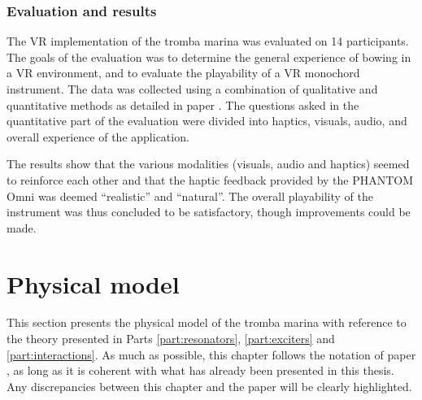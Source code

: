 \subsubsection{Evaluation and results}
The VR implementation of the tromba marina was evaluated on 14 participants. The goals of the evaluation was to determine the general experience of bowing in a VR environment, and to evaluate the playability of a VR monochord instrument.
The data was collected using a combination of qualitative and quantitative methods as detailed in paper \citeP[E]. The questions asked in the quantitative part of the evaluation were divided into haptics, visuals, audio, and overall experience of the application.

The results show that the various modalities (visuals, audio and haptics) seemed to reinforce each other and that the haptic feedback provided by the PHANTOM Omni was deemed ``realistic'' and ``natural''. The overall playability of the instrument was thus concluded to be satisfactory, though improvements could be made.

  

\section{Physical model}
This section presents the physical model of the tromba marina with reference to the theory presented in Parts \ref{part:resonators}, \ref{part:exciters} and \ref{part:interactions}.
As much as possible, this chapter follows the notation of paper \citeP[D], as long as it is coherent with what has already been presented in this thesis. Any discrepancies between this chapter and the paper will be clearly highlighted. 

